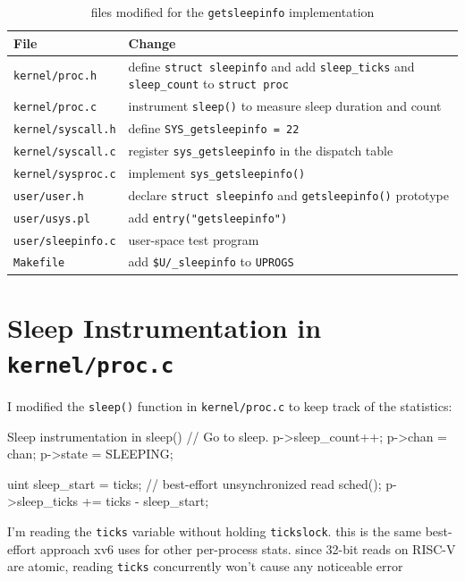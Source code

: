 \documentclass[12pt]{report}
\begin{document}
\begin{table}[h]
\centering
\begin{tabularx}{\textwidth}{lX}
\toprule
\textbf{File} & \textbf{Change} \\
\midrule
\texttt{kernel/proc.h}   & define \texttt{struct sleepinfo} and add \texttt{sleep\_ticks} and \texttt{sleep\_count} to \texttt{struct proc} \\
\texttt{kernel/proc.c}   & instrument \texttt{sleep()} to measure sleep duration and count \\
\texttt{kernel/syscall.h} & define \texttt{SYS\_getsleepinfo = 22} \\
\texttt{kernel/syscall.c} & register \texttt{sys\_getsleepinfo} in the dispatch table \\
\texttt{kernel/sysproc.c} & implement \texttt{sys\_getsleepinfo()} \\
\texttt{user/user.h}      & declare \texttt{struct sleepinfo} and \texttt{getsleepinfo()} prototype \\
\texttt{user/usys.pl}     & add \texttt{entry("getsleepinfo")} \\
\texttt{user/sleepinfo.c} & user-space test program \\
\texttt{Makefile}          & add \texttt{\$U/\_sleepinfo} to \texttt{UPROGS} \\
\bottomrule
\end{tabularx}
\caption{files modified for the \texttt{getsleepinfo} implementation}
\end{table}

\section{Sleep Instrumentation in \texttt{kernel/proc.c}}

I modified the \texttt{sleep()} function in \texttt{kernel/proc.c} to keep track of the statistics:

\begin{cbox}{Sleep instrumentation in sleep()}
// Go to sleep.
p->sleep_count++;
p->chan = chan;
p->state = SLEEPING;

uint sleep_start = ticks; // best-effort unsynchronized read
sched();
p->sleep_ticks += ticks - sleep_start;
\end{cbox}

\begin{notebox}
I'm reading the \texttt{ticks} variable without holding \texttt{tickslock}. this is the same best-effort approach xv6 uses for other per-process stats. since 32-bit reads on RISC-V are atomic, reading \texttt{ticks} concurrently won't cause any noticeable error
\end{notebox}
\end{document}
